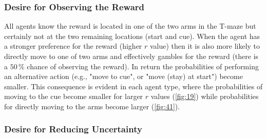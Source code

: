 \subsubsection{Desire for Observing the Reward}

All agents know the reward is located in one of the two arms in the T-maze but certainly not at the two remaining locations (start and cue). When the agent has a stronger preference for the reward (higher \(r\) value) then it is also more likely to directly move to one of two arms and effectively gambles for the reward (there is a \(50\,\%\) chance of observing the reward). In return the probabilities of performing an alternative action (e.g., "move to cue", or "move (stay) at start") become smaller. This consequence is evident in each agent type, where the probabilities of moving to the cue become smaller for larger \(r\) values (\cref{fig:19}) while probabilities for directly moving to the arms become larger (\cref{fig:41}).

\subsubsection{Desire for Reducing Uncertainty}

